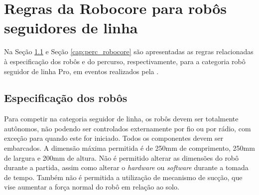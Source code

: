 






\vspace{1cm}
\section{Regras da Robocore para robôs seguidores de linha} \label{cap:regras_comp}

Na Seção \ref{cap:espc_robocore} e Seção \ref{cap:perc_robocore} são apresentadas as regras relacionadas à 
especificação dos robôs e do percurso, respectivamente, 
para a categoria robô seguidor de linha Pro, em eventos realizados pela .

\vspace{1cm}
\subsection{Especificação dos robôs} \label{cap:espc_robocore}

Para competir na categoria seguidor de linha, os robôs devem ser totalmente autônomos, não podendo ser controlados 
externamente por fio ou por rádio, com exceção para quando este for iniciado. Todos os componentes devem ser embarcados. A 
dimensão máxima permitida é de 250mm   de   comprimento,   250mm   de   largura   e   200mm   de   altura. Não é 
permitido alterar as dimensões do robô durante a partida, assim como alterar o \textit{hardware} ou \textit{software} 
durante a tomada de tempo. Também não é permitida a utilização de mecanismo de sucção, 
que vise aumentar a força normal do robô em relação ao solo.

